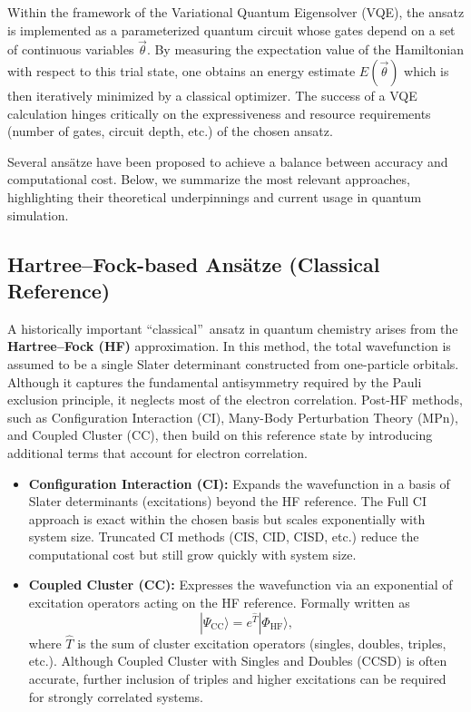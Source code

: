Within the framework of the Variational Quantum Eigensolver (VQE), the ansatz is implemented as a parameterized quantum circuit whose gates depend on a set of continuous variables $\vec{\theta}$. By measuring the expectation value of the Hamiltonian with respect to this trial state, one obtains an energy estimate $E(\vec{\theta})$ which is then iteratively minimized by a classical optimizer. The success of a VQE calculation hinges critically on the expressiveness and resource requirements (number of gates, circuit depth, etc.) of the chosen ansatz.

Several ans\"{a}tze have been proposed to achieve a balance between accuracy and computational cost. Below, we summarize the most relevant approaches, highlighting their theoretical underpinnings and current usage in quantum simulation.

\subsection{Hartree--Fock-based Ans\"{a}tze (Classical Reference)}
A historically important \textquotedblleft classical\textquotedblright\ ansatz in quantum chemistry arises from the \textbf{Hartree--Fock (HF)} approximation. In this method, the total wavefunction is assumed to be a single Slater determinant constructed from one-particle orbitals. Although it captures the fundamental antisymmetry required by the Pauli exclusion principle, it neglects most of the electron correlation. Post-HF methods, such as Configuration Interaction (CI), Many-Body Perturbation Theory (MPn), and Coupled Cluster (CC), then build on this reference state by introducing additional terms that account for electron correlation.  

\begin{itemize}
    \item \textbf{Configuration Interaction (CI):} Expands the wavefunction in a basis of Slater determinants (excitations) beyond the HF reference. The Full CI approach is exact within the chosen basis but scales exponentially with system size. Truncated CI methods (CIS, CID, CISD, etc.) reduce the computational cost but still grow quickly with system size.

    \item \textbf{Coupled Cluster (CC):} Expresses the wavefunction via an exponential of excitation operators acting on the HF reference. Formally written as 
    \[
       |\Psi_{\mathrm{CC}}\rangle = e^{\hat{T}}|\Phi_{\mathrm{HF}}\rangle,
    \]
    where $\hat{T}$ is the sum of cluster excitation operators (singles, doubles, triples, etc.). Although Coupled Cluster with Singles and Doubles (CCSD) is often accurate, further inclusion of triples and higher excitations can be required for strongly correlated systems.
\end{itemize}


